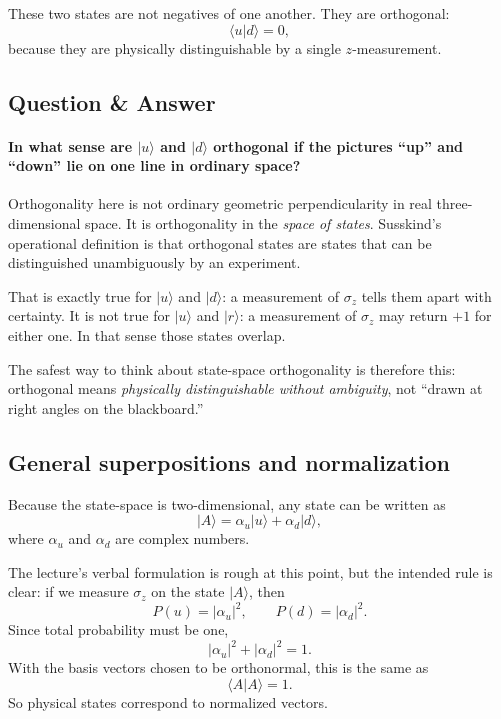 These two states are not negatives of one another. They are orthogonal:
\begin{equation}
\langle u|d\rangle=0,
\end{equation}
because they are physically distinguishable by a single \(z\)-measurement.

\subsection{Question \& Answer}

\paragraph{In what sense are \(|u\rangle\) and \(|d\rangle\) orthogonal if the pictures ``up'' and ``down'' lie on one line in ordinary space?}

Orthogonality here is not ordinary geometric perpendicularity in real three-dimensional space. It is orthogonality in the \emph{space of states}. Susskind's operational definition is that orthogonal states are states that can be distinguished unambiguously by an experiment.

That is exactly true for \(|u\rangle\) and \(|d\rangle\): a measurement of \(\sigma_z\) tells them apart with certainty. It is not true for \(|u\rangle\) and \(|r\rangle\): a measurement of \(\sigma_z\) may return \(+1\) for either one. In that sense those states overlap.

The safest way to think about state-space orthogonality is therefore this: orthogonal means \emph{physically distinguishable without ambiguity}, not ``drawn at right angles on the blackboard.''

\subsection{General superpositions and normalization}

Because the state-space is two-dimensional, any state can be written as
\begin{equation}
|A\rangle=\alpha_u|u\rangle+\alpha_d|d\rangle,
\end{equation}
where \(\alpha_u\) and \(\alpha_d\) are complex numbers.

The lecture's verbal formulation is rough at this point, but the intended rule is clear: if we measure \(\sigma_z\) on the state \(|A\rangle\), then
\begin{equation}
P(u)=|\alpha_u|^2,\qquad P(d)=|\alpha_d|^2.
\end{equation}
Since total probability must be one,
\begin{equation}
|\alpha_u|^2+|\alpha_d|^2=1.
\end{equation}
With the basis vectors chosen to be orthonormal, this is the same as
\begin{equation}
\langle A|A\rangle=1.
\end{equation}
So physical states correspond to normalized vectors.


